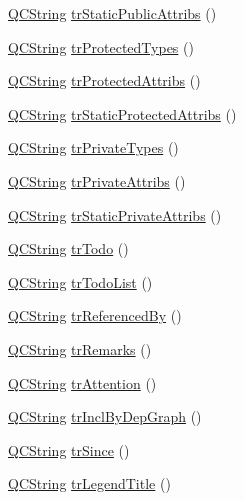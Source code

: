\begin{DoxyCompactItemize}
\hyperlink{class_q_c_string}{Q\+C\+String} \hyperlink{class_translator_dutch_ae09cbdfacc7a8c186365d34fb84065db}{tr\+Static\+Public\+Attribs} ()
\item 
\hyperlink{class_q_c_string}{Q\+C\+String} \hyperlink{class_translator_dutch_a63eb5c3c64407c7cb01318fa601ec0a3}{tr\+Protected\+Types} ()
\item 
\hyperlink{class_q_c_string}{Q\+C\+String} \hyperlink{class_translator_dutch_a12b229b6e7465baed4339169ee38ab40}{tr\+Protected\+Attribs} ()
\item 
\hyperlink{class_q_c_string}{Q\+C\+String} \hyperlink{class_translator_dutch_a2ac85295d13c101c58c9f06a7891e838}{tr\+Static\+Protected\+Attribs} ()
\item 
\hyperlink{class_q_c_string}{Q\+C\+String} \hyperlink{class_translator_dutch_a76b9ec326c03351d6ba76929290ce434}{tr\+Private\+Types} ()
\item 
\hyperlink{class_q_c_string}{Q\+C\+String} \hyperlink{class_translator_dutch_a7e4a0a49d3090049d761dd13e3d7885f}{tr\+Private\+Attribs} ()
\item 
\hyperlink{class_q_c_string}{Q\+C\+String} \hyperlink{class_translator_dutch_a98989f1564972c2afaf0823ed39b484f}{tr\+Static\+Private\+Attribs} ()
\item 
\hyperlink{class_q_c_string}{Q\+C\+String} \hyperlink{class_translator_dutch_acc70d3be78227dc0f43d385478bd1d15}{tr\+Todo} ()
\item 
\hyperlink{class_q_c_string}{Q\+C\+String} \hyperlink{class_translator_dutch_ad327b25b8913ea5261090f41c131f52f}{tr\+Todo\+List} ()
\item 
\hyperlink{class_q_c_string}{Q\+C\+String} \hyperlink{class_translator_dutch_af1e7e8b7bb86907c444c304a43919c68}{tr\+Referenced\+By} ()
\item 
\hyperlink{class_q_c_string}{Q\+C\+String} \hyperlink{class_translator_dutch_ae1ff9b9840f468a2092a453ebafbd733}{tr\+Remarks} ()
\item 
\hyperlink{class_q_c_string}{Q\+C\+String} \hyperlink{class_translator_dutch_ac0f4911f1fc06389005484c9a39a05eb}{tr\+Attention} ()
\item 
\hyperlink{class_q_c_string}{Q\+C\+String} \hyperlink{class_translator_dutch_a8a563ae26cc303bf8293485c58565c0c}{tr\+Incl\+By\+Dep\+Graph} ()
\item 
\hyperlink{class_q_c_string}{Q\+C\+String} \hyperlink{class_translator_dutch_a5f8c50ac962100147a0ebd5be3d62e17}{tr\+Since} ()
\item 
\hyperlink{class_q_c_string}{Q\+C\+String} \hyperlink{class_translator_dutch_abdaaa17f0b13f333da7a5327514799c9}{tr\+Legend\+Title} ()

\end{DoxyCompactItemize}
